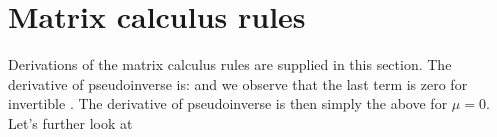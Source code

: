 \documentclass[runningheads]{llncs}
\def\eqlabel#1{\label{eq:#1}}
\def\tr{^\top}
\begin{document}
\section{Matrix calculus rules}
\label{sec:mxcalc}
Derivations of the matrix calculus rules are supplied in this section.   The derivative of pseudoinverse is:
\dmMupinv
and we observe that the last term is zero for invertible \mA.  
The derivative of pseudoinverse is then simply the above for $\mu=0$.
Let's further look at 
\dmAmupinvA
\end{document}
